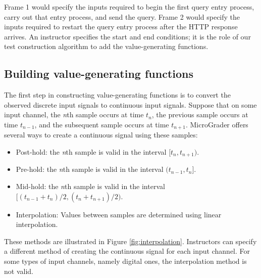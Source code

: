 \documentclass[12pt]{article}
\begin{document}
Frame 1 would specify the inputs required to begin the first query entry process, carry out that entry process, and send the query.  Frame 2 would specify the inputs required to restart the query entry process after the HTTP response arrives.  An instructor specifies the start and end conditions; it is the role of our test construction algorithm to add the value-generating functions.

\subsection{Building value-generating functions}
The first step in constructing value-generating functions is to convert the observed discrete input signals to continuous input signals.  Suppose that on some input channel, the \textit{n}th sample occurs at time $t_n$, the previous sample occurs at time $t_{n-1}$, and the subsequent sample occurs at time $t_{n+1}$.  MicroGrader offers several ways to create a continuous signal using these samples:

\begin{itemize}
\item Post-hold: the \textit{n}th sample is valid in the interval $[t_n, t_{n+1})$.
\item Pre-hold: the \textit{n}th sample is valid in the interval $(t_{n-1}, t_n]$.
\item Mid-hold: the \textit{n}th sample is valid in the interval $[(t_{n-1} + t_n)/2, (t_n + t_{n+1})/2)$.
\item Interpolation: Values between samples are determined using linear interpolation. 
\end{itemize}

These methods are illustrated in Figure \ref{fig:interpolation}.  Instructors can specify a different method of creating the continuous signal for each input channel.  For some types of input channels, namely digital ones, the interpolation method is not valid.
\end{document}
